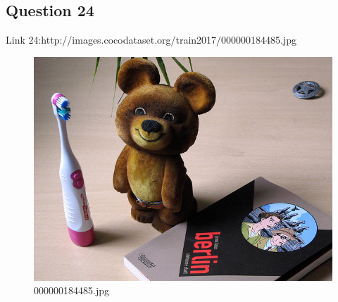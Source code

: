 \subsection*{Question 24}
Link 24:http://images.cocodataset.org/train2017/000000184485.jpg
    \begin{figure}[h]
        \centering
        \includegraphics[width=0.8\linewidth]{../image set/easy/000000184485.jpg}
        \caption{000000184485.jpg}
    \end{figure}
